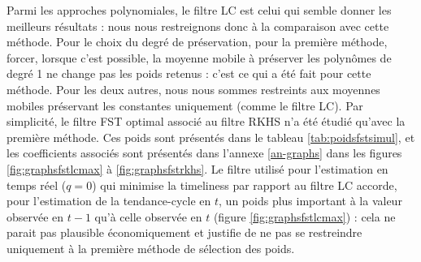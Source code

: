 \documentclass[
  11pt,
  french,
  a4paper]{article}
\newcommand\1{\mathds{1}}
\begin{document}
Parmi les approches polynomiales, le filtre LC est celui qui semble donner les meilleurs résultats : nous nous restreignons donc à la comparaison avec cette méthode.
Pour le choix du degré de préservation, pour la première méthode, forcer, lorsque c'est possible, la moyenne mobile à préserver les polynômes de degré 1 ne change pas les poids retenus : c'est ce qui a été fait pour cette méthode. Pour les deux autres, nous nous sommes restreints aux moyennes mobiles préservant les constantes uniquement (comme le filtre LC).
Par simplicité, le filtre FST optimal associé au filtre RKHS n'a été étudié qu'avec la première méthode.
Ces poids sont présentés dans le tableau \ref{tab:poidsfstsimul}, et les coefficients associés sont présentés dans l'annexe \ref{an-graphs} dans les figures \ref{fig:graphsfstlcmax} à \ref{fig:graphsfstrkhs}.
Le filtre utilisé pour l'estimation en temps réel (\(q=0\)) qui minimise la timeliness par rapport au filtre LC accorde, pour l'estimation de la tendance-cycle en \(t\), un poids plus important à la valeur observée en \(t-1\) qu'à celle observée en \(t\) (figure \ref{fig:graphsfstlcmax}) : cela ne parait pas plausible économiquement et justifie de ne pas se restreindre uniquement à la première méthode de sélection des poids.
\end{document}

